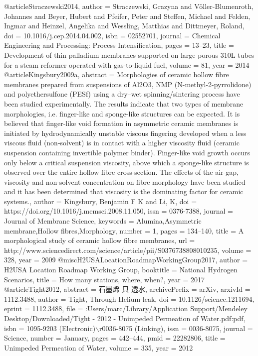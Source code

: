 @article{Straczewski2014,
author = {Straczewski, Grazyna and V{\"{o}}ller-Blumenroth, Johannes and Beyer, Hubert and Pfeifer, Peter and Steffen, Michael and Felden, Ingmar and Heinzel, Angelika and Wessling, Matthias and Dittmeyer, Roland},
doi = {10.1016/j.cep.2014.04.002},
isbn = {02552701},
journal = {Chemical Engineering and Processing: Process Intensification},
pages = {13--23},
title = {{Development of thin palladium membranes supported on large porous 310L tubes for a steam reformer operated with gas-to-liquid fuel}},
volume = {81},
year = {2014}
}
@article{Kingsbury2009a,
abstract = {Morphologies of ceramic hollow fibre membranes prepared from suspensions of Al2O3, NMP (N-methyl-2-pyrrolidone) and polyethersulfone (PESf) using a dry–wet spinning/sintering process have been studied experimentally. The results indicate that two types of membrane morphologies, i.e. finger-like and sponge-like structures can be expected. It is believed that finger-like void formation in asymmetric ceramic membranes is initiated by hydrodynamically unstable viscous fingering developed when a less viscous fluid (non-solvent) is in contact with a higher viscosity fluid (ceramic suspension containing invertible polymer binder). Finger-like void growth occurs only below a critical suspension viscosity, above which a sponge-like structure is observed over the entire hollow fibre cross-section. The effects of the air-gap, viscosity and non-solvent concentration on fibre morphology have been studied and it has been determined that viscosity is the dominating factor for ceramic systems.},
author = {Kingsbury, Benjamin F K and Li, K},
doi = {https://doi.org/10.1016/j.memsci.2008.11.050},
issn = {0376-7388},
journal = {Journal of Membrane Science},
keywords = {Alumina,Asymmetric membrane,Hollow fibres,Morphology},
number = {1},
pages = {134--140},
title = {{A morphological study of ceramic hollow fibre membranes}},
url = {http://www.sciencedirect.com/science/article/pii/S0376738808010235},
volume = {328},
year = {2009}
}
@misc{H2USALocationRoadmapWorkingGroup2017,
author = {{H2USA Location Roadmap Working Group}},
booktitle = {National Hydrogen Scenarios},
title = {{How many stations, where, when?}},
year = {2017}
}
@article{Tight2012,
abstract = {石墨烯 只 透水},
archivePrefix = {arXiv},
arxivId = {1112.3488},
author = {Tight, Through Helium-leak},
doi = {10.1126/science.1211694},
eprint = {1112.3488},
file = {:Users/marc/Library/Application Support/Mendeley Desktop/Downloaded/Tight - 2012 - Unimpeded Permeation of Water.pdf:pdf},
isbn = {1095-9203 (Electronic)$\backslash$r0036-8075 (Linking)},
issn = {0036-8075},
journal = {Science},
number = {January},
pages = {442--444},
pmid = {22282806},
title = {{Unimpeded Permeation of Water}},
volume = {335},
year = {2012}
}
